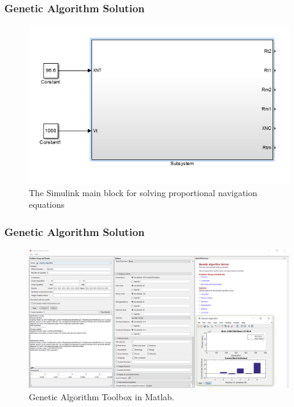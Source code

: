 \documentclass{beamer}
\begin{document}
\begin{frame}
\frametitle{Genetic Algorithm Solution}
	\begin{figure}
		\centering
		\includegraphics[scale = 0.75]{fig/PNmainBlock.PNG}
		\caption{The Simulink main block for solving proportional navigation equations}
	\end{figure}
	
\end{frame}
\begin{frame}
\frametitle{Genetic Algorithm Solution}
\begin{figure}[H]
	\centering
	\includegraphics[scale = 0.25]{fig/GApoly.PNG}
	\caption{Genetic Algorithm Toolbox in Matlab.}
	\label{GA toolbox poly}
\end{figure}
\end{frame}
\end{document}
